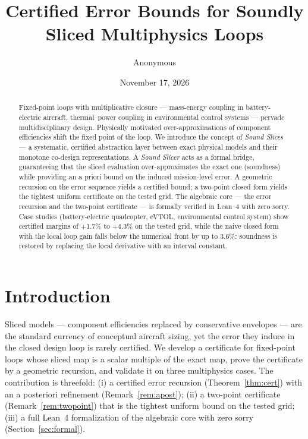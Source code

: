 \documentclass[11pt]{article}
\title{Certified Error Bounds for Soundly Sliced Multiphysics Loops}
\author{Anonymous}
\date{November 17, 2026}
\numberwithin{equation}{section}
\begin{document}
\maketitle

\begin{abstract}
Fixed-point loops with multiplicative closure --- mass-energy coupling in battery-electric aircraft, thermal--power coupling in environmental control systems --- pervade multidisciplinary design. Physically motivated over-approximations of component efficiencies shift the fixed point of the loop. We introduce the concept of \emph{Sound Slices} --- a systematic, certified abstraction layer between exact physical models and their monotone co-design representations. A \emph{Sound Slicer} acts as a formal bridge, guaranteeing that the sliced evaluation over-approximates the exact one (soundness) while providing an a priori bound on the induced mission-level error. A geometric recursion on the error sequence yields a certified bound; a two-point closed form yields the tightest uniform certificate on the tested grid. The algebraic core --- the error recursion and the two-point certificate --- is formally verified in Lean~4 with zero sorry. Case studies (battery-electric quadcopter, eVTOL, environmental control system) show certified margins of +1.7\% to +4.3\% on the tested grid, while the naive closed form with the local loop gain falls below the numerical front by up to 3.6\%: soundness is restored by replacing the local derivative with an interval constant.
\end{abstract}

\section{Introduction}
Sliced models --- component efficiencies replaced by conservative envelopes ---
are the standard currency of conceptual aircraft sizing, yet the error they
induce in the closed design loop is rarely certified. We develop a certificate
for fixed-point loops whose sliced map is a scalar multiple of the exact map,
prove the certificate by a geometric recursion, and validate it on three
multiphysics cases. The contribution is threefold: (i) a certified error
recursion (Theorem~\ref{thm:cert}) with an a posteriori refinement
(Remark~\ref{rem:apost}); (ii) a two-point certificate
(Remark~\ref{rem:twopoint}) that is the tightest uniform bound on the tested
grid; (iii) a full Lean~4 formalization of the algebraic core with zero
sorry (Section~\ref{sec:formal}).
\end{document}
